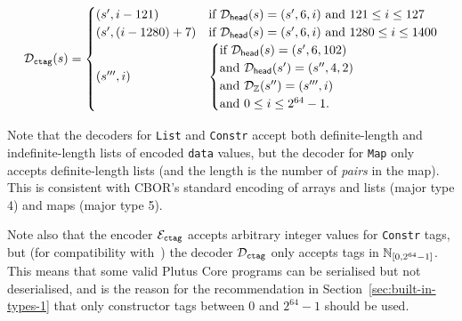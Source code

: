 \medskip
$$
\mathcal{D}_{\texttt{ctag}}(s) =
\begin{cases}
  (s', i-121) & \text{if $\mathcal{D}_{\mathsf{head}}(s) = (s', 6, i)$ and $121 \leq i \leq 127$}\\
  (s', (i-1280)+7) & \text{if $\mathcal{D}_{\mathsf{head}}(s) = (s', 6, i)$ and $1280 \leq i \leq 1400$}\\
  (s''', i) &
  \begin{cases}
    \text{if $\mathcal{D}_{\mathsf{head}}(s) = (s', 6, 102)$}\\
    \text{and $\mathcal{D}_{\mathsf{head}}(s') = (s'', 4, 2)$}\\
    \text{and $\mathcal{D}_{\mathbb{Z}}(s'') = (s''', i)$}\\
    \text{and $0 \leq i \leq 2^{64}-1$}.
    \end{cases}\\
  \end{cases}
$$

\noindent
Note that the decoders for \texttt{List} and \texttt{Constr} accept both
definite-length and indefinite-length lists of encoded \texttt{data} values, but
the decoder for \texttt{Map} only accepts definite-length lists (and the length
is the number of \textit{pairs} in the map).  This is consistent with CBOR's
standard encoding of arrays and lists (major type 4) and maps (major type 5).

Note also that the encoder $\mathcal{E}_{\texttt{ctag}}$ accepts arbitrary integer values for
\texttt{Constr} tags, but (for compatibility with~\cite{CBOR-alternatives}) the
decoder $\mathcal{D}_{\texttt{ctag}}$ only accepts tags in $\mathbb{N}_{[0,2^{64}-1]}$.  This
means that some valid Plutus Core programs can be serialised but not
deserialised, and is the reason for the recommendation in
Section~\ref{sec:built-in-types-1} that only constructor tags between 0 and
$2^{64}-1$ should be used.
